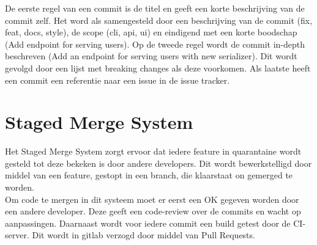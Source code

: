 De eerste regel van een commit is de titel en geeft een korte beschrijving van de commit zelf. Het word als samengesteld door een beschrijving van de commit (fix, feat, docs, style), de scope (cli, api, ui) en eindigend met een korte boodschap (Add endpoint for serving users). Op de tweede regel wordt de commit in-depth beschreven (Add an endpoint for serving users with new serializer). Dit wordt gevolgd door een lijst met breaking changes als deze voorkomen. Als laatste heeft een commit een referentie naar een issue in de issue tracker.

\section{Staged Merge System}

Het Staged Merge System zorgt ervoor dat iedere feature in quarantaine wordt gesteld tot deze bekeken is door andere developers. Dit wordt bewerkstelligd door middel van een feature, gestopt in een branch, die klaarstaat on gemerged te worden. \\

Om code te mergen in dit systeem moet er eerst een OK gegeven worden door een andere developer. Deze geeft een code-review over de commits en wacht op aanpassingen. Daarnaast wordt voor iedere commit een build getest door de CI-server. Dit wordt in gitlab verzogd door middel van Pull Requests. \\
